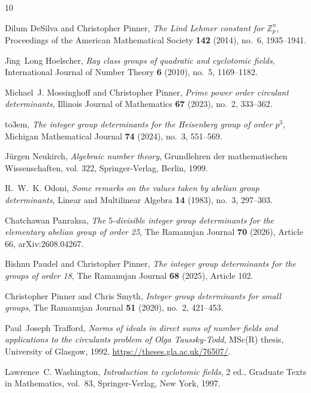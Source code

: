 \documentclass[11pt]{amsart}
\theoremstyle{plain}
\theoremstyle{definition}
\numberwithin{equation}{section}
\begin{document}
\providecommand{\bysame}{\leavevmode\hbox to3em{\hrulefill}\thinspace}
\providecommand{\MR}{\relax\ifhmode\unskip\space\fi MR }
\providecommand{\MRhref}[2]{%
  \href{http://www.ams.org/mathscinet-getitem?mr=#1}{#2}
}
\providecommand{\href}[2]{#2}
\begin{thebibliography}{10}

Dilum DeSilva and Christopher Pinner, \emph{The {L}ind {L}ehmer constant for
  $\mathbb{Z}_p^n$}, Proceedings of the American Mathematical Society
  \textbf{142} (2014), no.~6, 1935--1941.

Jing~Long Hoelscher, \emph{Ray class groups of quadratic and cyclotomic
  fields}, International Journal of Number Theory \textbf{6} (2010), no.~5,
  1169--1182.

Michael~J. Mossinghoff and Christopher Pinner, \emph{Prime power order
  circulant determinants}, Illinois Journal of Mathematics \textbf{67} (2023),
  no.~2, 333--362.

\bysame, \emph{The integer group determinants for the {H}eisenberg group of
  order $p^3$}, Michigan Mathematical Journal \textbf{74} (2024), no.~3,
  551--569.

J{\"u}rgen Neukirch, \emph{Algebraic number theory}, Grundlehren der
  mathematischen Wissenschaften, vol. 322, Springer-Verlag, Berlin, 1999.

R.~W.~K. Odoni, \emph{Some remarks on the values taken by abelian group
  determinants}, Linear and Multilinear Algebra \textbf{14} (1983), no.~3,
  297--303.

Chatchawan Panraksa, \emph{The $5$-divisible integer group determinants for the
  elementary abelian group of order 25}, The Ramanujan Journal \textbf{70}
  (2026), Article 66,
  \href{https://arxiv.org/abs/2608.04267}{arXiv:2608.04267}.

Bishnu Paudel and Christopher Pinner, \emph{The integer group determinants for
  the groups of order 18}, The Ramanujan Journal \textbf{68} (2025), Article
  102.

Christopher Pinner and Chris Smyth, \emph{Integer group determinants for small
  groups}, The Ramanujan Journal \textbf{51} (2020), no.~2, 421--453.

Paul~Joseph Trafford, \emph{Norms of ideals in direct sums of number fields and
  applications to the circulants problem of {Olga Taussky-Todd}}, {MSc(R)}
  thesis, University of Glasgow, 1992, \url{https://theses.gla.ac.uk/76507/}.

Lawrence~C. Washington, \emph{Introduction to cyclotomic fields}, 2 ed.,
  Graduate Texts in Mathematics, vol.~83, Springer-Verlag, New York, 1997.

\end{thebibliography}
\end{document}
